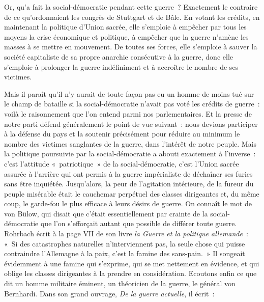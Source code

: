 \documentclass[french,twoside]{book} %
\begin{document}
\noindent Or, qu’a fait la social-démocratie pendant cette guerre ? Exactement le contraire de ce qu’ordonnaient les congrès de Stuttgart et de Bâle. En votant les crédits, en maintenant la politique d’Union sacrée, elle s’emploie à empêcher par tous les moyens la crise économique et politique, à empêcher que la guerre n’amène les masses à se mettre en mouvement. De toutes ses forces, elle s’emploie à sauver la  société capitaliste de sa propre anarchie consécutive à la guerre, donc elle s’emploie à prolonger la guerre indéfiniment et à accroître le nombre de ses victimes.\par
Mais il paraît qu’il n’y aurait de toute façon pas eu un homme de moins tué sur le champ de bataille si la social-démocratie n’avait pas voté les crédits de guerre : voilà le raisonnement que l’on entend parmi nos parlementaires. Et la presse de notre parti défend généralement le point de vue suivant : nous devions participer à la défense du pays et la soutenir précisément pour réduire au minimum le nombre des victimes sanglantes de la guerre, dans l’intérêt de notre peuple. Mais la politique poursuivie par la social-démocratie a abouti exactement à l’inverse : c’est l’attitude « patriotique » de la social-démocratie, c’est l’Union sacrée assurée à l’arrière qui ont permis à la guerre impérialiste de déchaîner ses furies sans être inquiétée. Jusqu’alors, la peur de l’agitation intérieure, de la fureur du peuple misérable était le cauchemar perpétuel des classes dirigeantes et, du même coup, le garde-fou le plus efficace à leurs désirs de guerre. On connaît le mot de von Bülow, qui disait que c’était essentiellement par crainte de la social-démocratie que l’on s’efforçait autant que possible de différer toute guerre. Rohrbach écrit à la page VII de son livre \emph{la Guerre et la politique allemande} : « Si des catastrophes naturelles n’interviennent pas, la seule chose qui puisse contraindre l’Allemagne à la paix, c’est la famine des sans-pain. » Il songeait évidemment à une famine qui s’exprime, qui se met nettement en évidence, et qui oblige les classes dirigeantes à la prendre en considération. Ecoutons enfin ce que dit un homme militaire éminent, un théoricien de la guerre, le général von Bernhardi. Dans son grand ouvrage, \emph{De la guerre actuelle}, il écrit :\par
\end{document}
